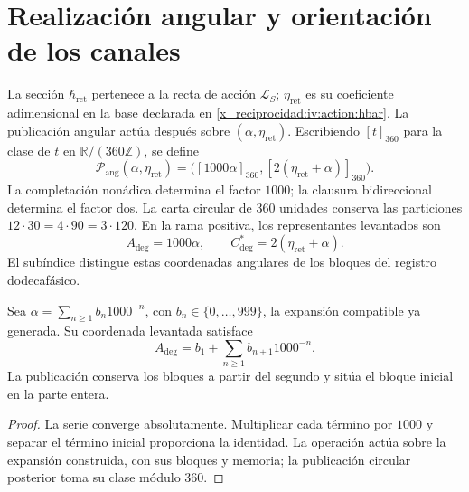 \section{Realización angular y orientación de los canales}
\label{x_reciprocidad:iv:angular:section}

La sección \(\hbar_{\mathrm{ret}}\) pertenece a la recta de
acción \(\mathcal L_S\); \(\eta_{\mathrm{ret}}\) es su
coeficiente adimensional en la base declarada en
\eqref{x_reciprocidad:iv:action:hbar}. La publicación angular actúa después
sobre \((\alpha,\eta_{\mathrm{ret}})\). Escribiendo
\([t]_{360}\) para la clase de \(t\) en
\(\mathbb R/(360\mathbb Z)\), se define
\begin{equation}
 \mathcal P_{\mathrm{ang}}(\alpha,\eta_{\mathrm{ret}})
 =\bigl([1000\alpha]_{360},
        [2(\eta_{\mathrm{ret}}+\alpha)]_{360}\bigr).
 \label{x_reciprocidad:iv:angular:publicacion}
\end{equation}
La completación nonádica determina el factor \(1000\); la
clausura bidireccional determina el factor dos. La carta circular
de \(360\) unidades conserva las particiones
\(12\cdot30=4\cdot90=3\cdot120\). En la rama positiva, los
representantes levantados son
\begin{equation}
 A_{\deg}=1000\alpha,\qquad
 C^*_{\deg}=2(\eta_{\mathrm{ret}}+\alpha).
 \label{x_reciprocidad:iv:angular:representantes}
\end{equation}
El subíndice distingue estas coordenadas angulares de los bloques
del registro dodecafásico.

\begin{proposition}
\label{x_reciprocidad:iv:angular:desplazamiento}
Sea \(\alpha=\sum_{n\geq1}b_n1000^{-n}\), con
\(b_n\in\{0,\ldots,999\}\), la expansión compatible ya
generada. Su coordenada levantada satisface
\[
 A_{\deg}=b_1+\sum_{n\geq1}b_{n+1}1000^{-n}.
\]
La publicación conserva los bloques a partir del segundo y
sitúa el bloque inicial en la parte entera.
\end{proposition}
\begin{proof}
La serie converge absolutamente. Multiplicar cada término por
\(1000\) y separar el término inicial proporciona la identidad.
La operación actúa sobre la expansión construida, con sus
bloques y memoria; la publicación circular posterior toma
su clase módulo \(360\).
\end{proof}

